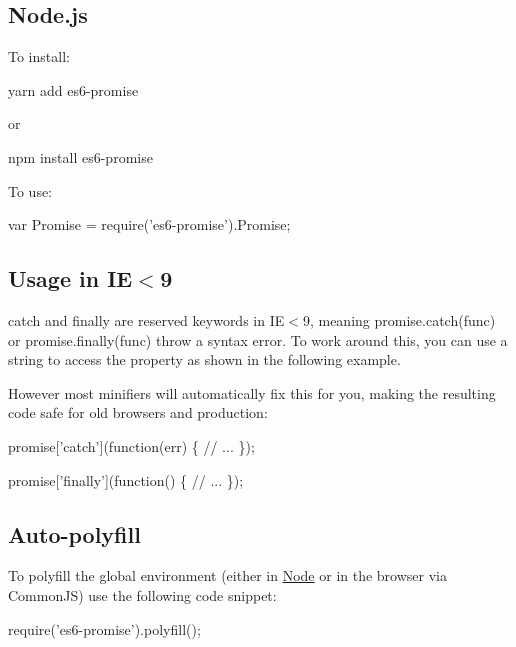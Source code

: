 \subsection*{Node.\+js}

To install\+:


\begin{DoxyCode}
yarn add es6-promise
\end{DoxyCode}


or


\begin{DoxyCode}
npm install es6-promise
\end{DoxyCode}


To use\+:


\begin{DoxyCode}
var Promise = require('es6-promise').Promise;
\end{DoxyCode}


\subsection*{Usage in IE$<$9}

{\ttfamily catch} and {\ttfamily finally} are reserved keywords in IE$<$9, meaning {\ttfamily promise.\+catch(func)} or {\ttfamily promise.\+finally(func)} throw a syntax error. To work around this, you can use a string to access the property as shown in the following example.

However most minifiers will automatically fix this for you, making the resulting code safe for old browsers and production\+:


\begin{DoxyCode}
promise['catch'](function(err) \{
  // ...
\});
\end{DoxyCode}



\begin{DoxyCode}
promise['finally'](function() \{
  // ...
\});
\end{DoxyCode}


\subsection*{Auto-\/polyfill}

To polyfill the global environment (either in \mbox{\hyperlink{classNode}{Node}} or in the browser via Common\+JS) use the following code snippet\+:


\begin{DoxyCode}
require('es6-promise').polyfill();
\end{DoxyCode}


